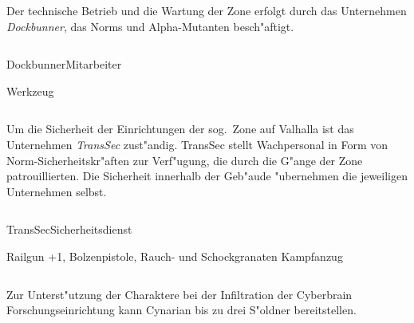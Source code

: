 
\begin{column}[l]{0.45}
    Der technische Betrieb und die Wartung der Zone erfolgt durch das Unternehmen \emph{Dockbunner}, das Norms und Alpha-Mutanten 
    besch"aftigt.
\end{column}
\begin{column}[r]{0.45}
    \begin{nscsheet}[h]{Dockbunner\newline{}Mitarbeiter}
        \nscstats[]
        \nscruler
        \begin{nscinventory}
            \nscitem[Waffen] Werkzeug
        \end{nscinventory}
    \end{nscsheet}
\end{column}    


\begin{column}[l]{0.45}
    Um die Sicherheit der Einrichtungen der sog.~Zone auf Valhalla ist das Unternehmen \emph{TransSec} zust"andig. TransSec stellt
    Wachpersonal in Form von Norm-Sicherheitskr"aften zur Verf"ugung, die durch die G"ange der Zone patrouillierten. Die Sicherheit
    innerhalb der Geb"aude "ubernehmen die jeweiligen Unternehmen selbst.
\end{column}
\begin{column}[r]{0.45}
    \begin{nscsheet}[h]{TransSec\newline{}Sicherheitsdienst}
        \nscstats[ATT=2,AGG=2]
        \nscruler
        \begin{nscinventory}
            \nscitem[Waffen] Railgun +1, Bolzenpistole, Rauch- und Schockgranaten
            \nscitem[R"ustung] Kampfanzug
        \end{nscinventory}
    \end{nscsheet}
\end{column}
\vfill

\pagebreak
{}

Zur Unterst"utzung der Charaktere bei der Infiltration der Cyberbrain Forschungseinrichtung kann Cynarian bis zu 
drei S"oldner bereitstellen.

